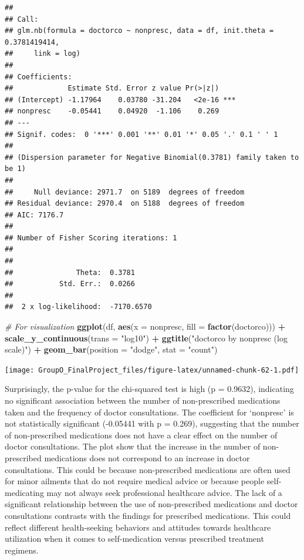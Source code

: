 \documentclass[
]{article}
\newenvironment{Shaded}{\begin{snugshade}}{\end{snugshade}}
\newcommand{\AttributeTok}[1]{\textcolor[rgb]{0.13,0.29,0.53}{#1}}
\newcommand{\CommentTok}[1]{\textcolor[rgb]{0.56,0.35,0.01}{\textit{#1}}}
\newcommand{\FunctionTok}[1]{\textcolor[rgb]{0.13,0.29,0.53}{\textbf{#1}}}
\newcommand{\NormalTok}[1]{#1}
\newcommand{\SpecialCharTok}[1]{\textcolor[rgb]{0.81,0.36,0.00}{\textbf{#1}}}
\newcommand{\StringTok}[1]{\textcolor[rgb]{0.31,0.60,0.02}{#1}}
\begin{document}
\begin{verbatim}
## 
## Call:
## glm.nb(formula = doctorco ~ nonpresc, data = df, init.theta = 0.3781419414, 
##     link = log)
## 
## Coefficients:
##             Estimate Std. Error z value Pr(>|z|)    
## (Intercept) -1.17964    0.03780 -31.204   <2e-16 ***
## nonpresc    -0.05441    0.04920  -1.106    0.269    
## ---
## Signif. codes:  0 '***' 0.001 '**' 0.01 '*' 0.05 '.' 0.1 ' ' 1
## 
## (Dispersion parameter for Negative Binomial(0.3781) family taken to be 1)
## 
##     Null deviance: 2971.7  on 5189  degrees of freedom
## Residual deviance: 2970.4  on 5188  degrees of freedom
## AIC: 7176.7
## 
## Number of Fisher Scoring iterations: 1
## 
## 
##               Theta:  0.3781 
##           Std. Err.:  0.0266 
## 
##  2 x log-likelihood:  -7170.6570
\end{verbatim}

\begin{Shaded}
\begin{Highlighting}[]
\CommentTok{\# For visualization}
\FunctionTok{ggplot}\NormalTok{(df, }\FunctionTok{aes}\NormalTok{(}\AttributeTok{x =}\NormalTok{ nonpresc, }\AttributeTok{fill =} \FunctionTok{factor}\NormalTok{(doctorco))) }\SpecialCharTok{+} 
  \FunctionTok{scale\_y\_continuous}\NormalTok{(}\AttributeTok{trans =} \StringTok{"log10"}\NormalTok{) }\SpecialCharTok{+}
  \FunctionTok{ggtitle}\NormalTok{(}\StringTok{"\textquotesingle{}doctorco\textquotesingle{} by \textquotesingle{}nonpresc\textquotesingle{} (log scale)"}\NormalTok{) }\SpecialCharTok{+}
  \FunctionTok{geom\_bar}\NormalTok{(}\AttributeTok{position =} \StringTok{"dodge"}\NormalTok{, }\AttributeTok{stat =} \StringTok{"count"}\NormalTok{)}
\end{Highlighting}
\end{Shaded}

\texttt{[image: GroupO\_FinalProject\_files/figure-latex/unnamed-chunk-62-1.pdf]}

Surprisingly, the p-value for the chi-squared test is high (p = 0.9632),
indicating no significant association between the number of
non-prescribed medications taken and the frequency of doctor
consultations. The coefficient for `nonpresc' is not statistically
significant (-0.05441 with p = 0.269), suggesting that the number of
non-prescribed medications does not have a clear effect on the number of
doctor consultations. The plot show that the increase in the number of
non-prescribed medications does not correspond to an increase in doctor
consultations. This could be because non-prescribed medications are
often used for minor ailments that do not require medical advice or
because people self-medicating may not always seek professional
healthcare advice. The lack of a significant relationship between the
use of non-prescribed medications and doctor consultations contrasts
with the findings for prescribed medications. This could reflect
different health-seeking behaviors and attitudes towards healthcare
utilization when it comes to self-medication versus prescribed treatment
regimens.
\end{document}
